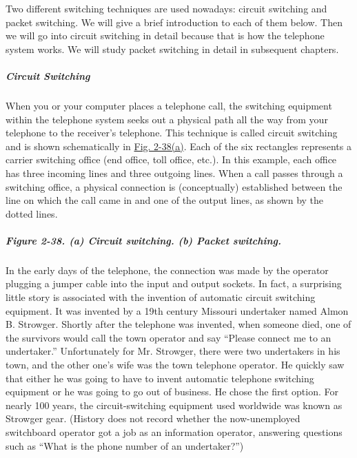Two different switching techniques are used nowadays: circuit switching
and packet switching. We will give a brief introduction to each of them
below. Then we will go into circuit switching in detail because that is
how the telephone system works. We will study packet switching in detail
in subsequent chapters.

\protect\hypertarget{0130661023_ch02lev1sec5.htmlux5cux23ch02lev3sec16}{}{}

\subparagraph{Circuit Switching}

When you or your computer places a telephone call, the switching
equipment within the telephone system seeks out a physical path all the
way from your telephone to the receiver's telephone. This technique is
called {circuit switching} and is shown schematically in
\protect\hyperlink{0130661023_ch02lev1sec5.htmlux5cux23ch02fig38}{Fig.
2-38(a)}. Each of the six rectangles represents a carrier switching
office (end office, toll office, etc.). In this example, each office has
three incoming lines and three outgoing lines. When a call passes
through a switching office, a physical connection is (conceptually)
established between the line on which the call came in and one of the
output lines, as shown by the dotted lines.

\subparagraph[Figure 2-38. (a) Circuit switching. (b) Packet
switching.]{\texorpdfstring{\protect\hypertarget{0130661023_ch02lev1sec5.htmlux5cux23ch02fig38}{}{}Figure
2-38. (a) Circuit switching. (b) Packet
switching.}{Figure 2-38. (a) Circuit switching. (b) Packet switching.}}


In the early days of the telephone, the connection was made by the
operator plugging a jumper cable into the input and output sockets. In
fact, a surprising little story is associated with the invention of
automatic circuit switching equipment. It was invented by a 19th century
Missouri undertaker named Almon B. Strowger. Shortly after the telephone
was invented, when someone died, one of the survivors would call the
town operator and say ``Please connect me to an undertaker.''
Unfortunately for Mr. Strowger, there were two undertakers in his town,
and the other one's wife was the town telephone operator. He quickly saw
that either he was going to have to invent automatic telephone switching
equipment or he was going to go out of business. He chose the first
option. For nearly 100 years, the circuit-switching equipment used
worldwide was known as Strowger gear. (History does not record whether
the now-unemployed switchboard operator got a job as an information
operator, answering questions such as ``What is the phone number of an
undertaker?'')

